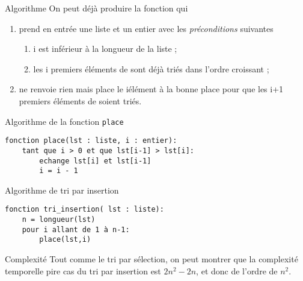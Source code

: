 \documentclass[10pt]{beamer}
\begin{document}
\begin{frame}{Algorithme}
On peut déjà produire la fonction  qui
\begin{enumerate}[--]
    \item 	prend en entrée une liste  et un entier  avec les \textit{préconditions} suivantes
            \begin{enumerate}[\textbullet]
                \item i est inférieur à la longueur de la liste ;
                \item  les i premiers éléments de  sont déjà triés dans l'ordre croissant ;
            \end{enumerate}
    \item	ne renvoie rien mais place le i\eme élément à la bonne place pour que les i+1 premiers éléments de  soient triés.
\end{enumerate}
\end{frame}
\begin{frame}[fragile]{Algorithme de la fonction \texttt{place}}
\begin{verbatim}
fonction place(lst : liste, i : entier):
    tant que i > 0 et que lst[i-1] > lst[i]:
        echange lst[i] et lst[i-1]
        i = i - 1
\end{verbatim}
\end{frame}
\begin{frame}[fragile]{Algorithme de tri par insertion}
\begin{verbatim}
fonction tri_insertion( lst : liste): 
    n = longueur(lst)
    pour i allant de 1 à n-1:
        place(lst,i)
\end{verbatim}
\end{frame}

\begin{frame}{Complexité}
Tout comme le tri par sélection, on peut montrer que la complexité temporelle pire cas du tri par insertion est $2n^2-2n$, et donc de l'ordre de $n^2$.
\end{frame}
\end{document}
